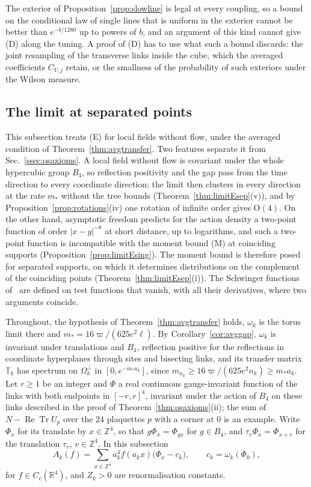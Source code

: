 \documentclass[aps,prd,twocolumn,superscriptaddress,nofootinbib,longbibliography,floatfix,amsmath,amssymb,10pt]{revtex4-2}
\theoremstyle{definition}
\theoremstyle{remark}
\newcommand{\R}{\mathbb{R}}
\newcommand{\Z}{\mathbb{Z}}
\newcommand{\ReTr}{\operatorname{Re}\operatorname{Tr}}
\begin{document}
The exterior of Proposition~\ref{prop:slowline} is legal at every coupling,
so a bound on the conditional law of single lines that is uniform in the
exterior cannot be better than $e^{-b/1280}$ up to powers of $b$, and an
argument of this kind cannot give (D) along the tuning. A proof of (D) has to
use what such a bound discards: the joint resampling of the transverse links
inside the cube, which the averaged coefficients $C_{V,j}$ retain, or the
smallness of the probability of such exteriors under the Wilson measure.

\subsection{The limit at separated points}\label{ssec:limitE}

This subsection treats (E) for local fields without flow, under the
averaged condition of Theorem~\ref{thm:avgtransfer}. Two features separate
it from Sec.~\ref{ssec:osaxioms}. A local field without flow is covariant
under the whole hypercubic group $B_4$, so reflection positivity and the gap
pass from the time direction to every coordinate direction; the limit then
clusters in every direction at the rate $m_*$ without the tree bounds
(Theorem~\ref{thm:limitEsep}(v)), and by
Proposition~\ref{prop:rotations}(iv) one rotation of infinite order gives
$\mathrm O(4)$. On the other hand, asymptotic freedom predicts for the action density a
two-point function of order $|x-y|^{-8}$ at short distance, up to
logarithms, and such a
two-point function is incompatible with the moment bound (M) at coinciding supports
(Proposition~\ref{prop:limitEsing}). The moment bound is therefore posed
for separated supports, on which it determines distributions on the
complement of the coinciding points (Theorem~\ref{thm:limitEsep}(i)). The
Schwinger functions of~\cite{OS73} are defined on test functions that
vanish, with all their derivatives, where two arguments coincide.

Throughout, the hypothesis of Theorem~\ref{thm:avgtransfer} holds,
$\omega_k$ is the torus limit there and $m_*=16\varpi/(625e^2\ell)$. By
Corollary~\ref{cor:avggap}, $\omega_k$ is invariant under translations and
$B_4$, reflection positive for the reflections in coordinate hyperplanes
through sites and bisecting links, and its transfer matrix $\mathbb T_k$ has
spectrum on $\Omega_k^\perp$ in $[0,e^{-m_*a_k}]$, since
$m_{n_k}\ge16\varpi/(625e^2n_k)\ge m_*a_k$. Let $r\ge1$ be an integer and
$\Phi$ a real continuous gauge-invariant function of the links with both
endpoints in $[-r,r]^4$, invariant under the action of $B_4$ on these links
described in the proof of Theorem~\ref{thm:osaxioms}(ii); the sum of
$N-\ReTr U_p$ over the $24$ plaquettes $p$ with a corner at $0$ is an
example. Write $\Phi_x$ for its translate by $x\in\Z^4$, so that
$g\Phi_x=\Phi_{gx}$ for $g\in B_4$, and $\tau_v\Phi_x=\Phi_{x+v}$ for the
translation $\tau_v$, $v\in\Z^4$. In this subsection
\[
A_k(f)=\sum_{x\in\Z^4}a_k^4f(a_kx)\bigl(\Phi_x-c_k\bigr),\qquad
c_k=\omega_k(\Phi_0),
\]
for $f\in C_c(\R^4)$, and $Z_k>0$ are renormalisation constants.
\end{document}
